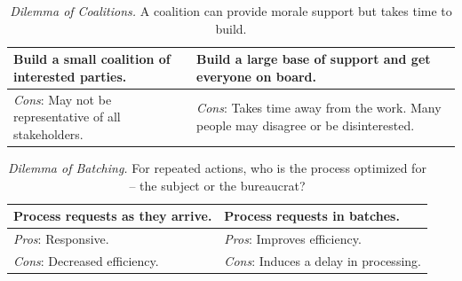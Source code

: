 

\begin{center}
\begin{table}[H] %
\begin{tabular}{ | m{\dilemmatablewidth}| m{\dilemmatablewidth} | } 
  \hline
  \textbf{Build a small coalition of interested parties.} & 
  \textbf{Build a large base of support and get everyone on board.} \\ 
  \hline
  \textit{Cons}: May not be representative of all stakeholders. & 
  \textit{Cons}: Takes time away from the work. Many people may disagree or be disinterested. \\  
  \hline
\end{tabular}
\caption{
\textit{Dilemma of Coalitions.}
A coalition can provide morale support but takes time to build.
}
\label{table:dilemma-how-to-change}
\end{table}
\end{center}



\begin{center}
\begin{table}[H] %
\begin{tabular}{ | m{\dilemmatablewidth}| m{\dilemmatablewidth} | } 
  \hline
  \textbf{Process requests as they arrive.} &
  \textbf{Process requests in batches.} \\
  \hline
  \textit{Pros}: Responsive. & 
  \textit{Pros}: Improves efficiency. \\
  \hline
  \textit{Cons}: Decreased efficiency. & 
  \textit{Cons}: Induces a delay in processing. \\
  \hline
\end{tabular}
\caption{
\textit{Dilemma of Batching.}
For repeated actions, who is the process optimized for -- the subject or the bureaucrat?
}
\label{table:dilemma-personal-batching-requests}
\end{table}
\end{center}

